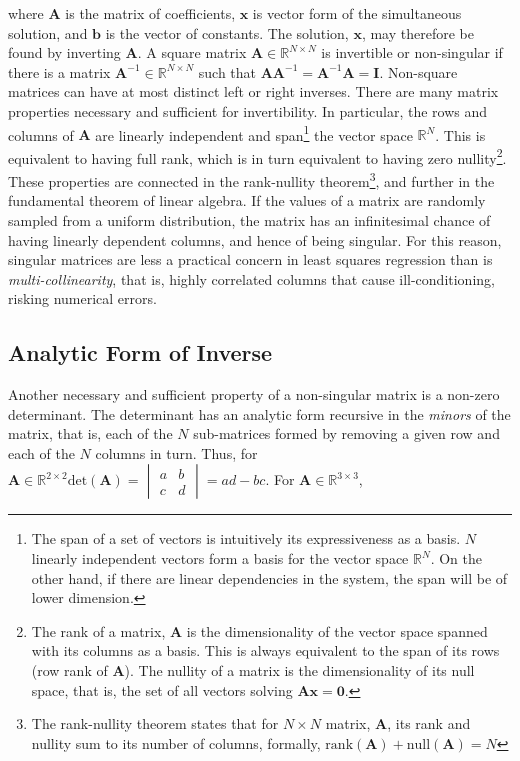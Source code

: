 \documentclass[11pt]{amsart}
\begin{document}
where $\mathbf{A}$ is the matrix of coefficients, $\mathbf{x}$ is vector form of the simultaneous solution, and $\mathbf{b}$ is the vector of constants. The solution, $\mathbf{x}$, may therefore be found by inverting $\mathbf{A}$. A square matrix $\mathbf{A} \in \mathbb{R}^{N\times N}$ is invertible or non-singular if there is a matrix $\mathbf{A}^{-1} \in \mathbb{R}^{N\times N}$ such that $\mathbf{A}\mathbf{A}^{-1} = \mathbf{A}^{-1}\mathbf{A} = \mathbf{I}$. Non-square matrices can have at most distinct left or right inverses. There are many matrix properties necessary and sufficient for invertibility. In particular, the rows and columns of $\mathbf{A}$ are linearly independent and span\footnote{The span of a set of vectors is intuitively its expressiveness as a basis. $N$ linearly independent vectors form a basis for the vector space $\mathbb{R}^{N}$. On the other hand, if there are linear dependencies in the system, the span will be of lower dimension.} the vector space $\mathbb{R}^{N}$. This is equivalent to having full rank, which is in turn equivalent to having zero nullity\footnote{The rank of a matrix, $\mathbf{A}$ is the dimensionality of the vector space spanned with its columns as a basis. This is always equivalent to the span of its rows (row rank of $\mathbf{A}$). The nullity of a matrix is the dimensionality of its null space, that is, the set of all vectors solving $\mathbf{A}\mathbf{x} = \mathbf{0}$.}. These properties are connected in the rank-nullity theorem\footnote{The rank-nullity theorem states that for $N \times N$ matrix, $\mathbf{A}$, its rank and nullity sum to its number of columns, formally, $\text{rank}(\mathbf{A}) + \text{null}(\mathbf{A}) = N$}, and further in the fundamental theorem of linear algebra. If the values of a matrix are randomly sampled from a uniform distribution, the matrix has an infinitesimal chance of having linearly dependent columns, and hence of being singular. For this reason, singular matrices are less a practical concern in least squares regression than is \emph{multi-collinearity}, that is, highly correlated columns that cause ill-conditioning, risking numerical errors.

\subsection{Analytic Form of Inverse}

Another necessary and sufficient property of a non-singular matrix is a non-zero determinant. The determinant has an analytic form recursive in the \emph{minors} of the matrix, that is, each of the $N$ sub-matrices formed by removing a given row and each of the $N$ columns in turn. Thus, for $\mathbf{A} \in \mathbb{R}^{2 \times 2} \text{det}(\mathbf{A}) =
\begin{vmatrix}
a&b\\
c&d
\end{vmatrix} =
ad - bc
$. For $\mathbf{A} \in \mathbb{R}^{3 \times 3}$,
\end{document}
